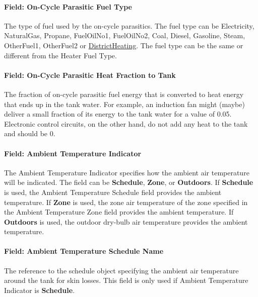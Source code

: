 \paragraph{Field: On-Cycle Parasitic Fuel Type}\label{field-on-cycle-parasitic-fuel-type}

The type of fuel used by the on-cycle parasitics. The fuel type can be Electricity, NaturalGas, Propane, FuelOilNo1, FuelOilNo2, Coal, Diesel, Gasoline, Steam, OtherFuel1, OtherFuel2 or \hyperref[districtheating]{DistrictHeating}. The fuel type can be the same or different from the Heater Fuel Type.

\paragraph{Field: On-Cycle Parasitic Heat Fraction to Tank}\label{field-on-cycle-parasitic-heat-fraction-to-tank}

The fraction of on-cycle parasitic fuel energy that is converted to heat energy that ends up in the tank water. For example, an induction fan might (maybe) deliver a small fraction of its energy to the tank water for a value of 0.05. Electronic control circuits, on the other hand, do not add any heat to the tank and should be 0.

\paragraph{Field: Ambient Temperature Indicator}\label{field-ambient-temperature-indicator-000}

The Ambient Temperature Indicator specifies how the ambient air temperature will be indicated. The field can be \textbf{Schedule}, \textbf{Zone}, or \textbf{Outdoors}. If \textbf{Schedule} is used, the Ambient Temperature Schedule field provides the ambient temperature. If \textbf{Zone} is used, the zone air temperature of the zone specified in the Ambient Temperature Zone field provides the ambient temperature. If \textbf{Outdoors} is used, the outdoor dry-bulb air temperature provides the ambient temperature.

\paragraph{Field: Ambient Temperature Schedule Name}\label{field-ambient-temperature-schedule-name-001}

The reference to the schedule object specifying the ambient air temperature around the tank for skin losses. This field is only used if Ambient Temperature Indicator is \textbf{Schedule}.


